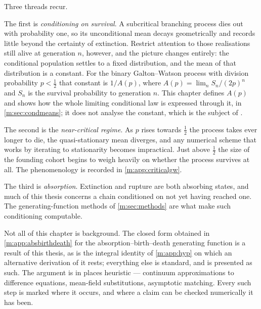 Three threads recur.

The first is \emph{conditioning on survival}. A subcritical branching process dies
out with probability one, so its unconditional mean decays geometrically and
records little beyond the certainty of extinction. Restrict attention to those
realisations still alive at generation $n$, however, and the picture changes
entirely: the conditional population settles to a fixed distribution, and the mean
of that distribution is a constant. For the binary Galton--Watson process with
division probability $p<\tfrac12$ that constant is $1/A(p)$, where
$A(p) = \lim_n S_n/(2p)^n$ and $S_n$ is the survival probability to generation $n$.
This chapter defines $A(p)$ and shows how the whole limiting conditional law is
expressed through it, in \cref{m:sec:condmeans}; it does not analyse the constant,
which is the subject of \ChA.

The second is the \emph{near-critical regime}. As $p$ rises towards $\tfrac12$ the
process takes ever longer to die, the quasi-stationary mean diverges, and any
numerical scheme that works by iterating to stationarity becomes impractical. Just
above $\tfrac12$ the size of the founding cohort begins to weigh heavily on whether
the process survives at all. The phenomenology is recorded in
\cref{m:app:criticalgw}.

The third is \emph{absorption}. Extinction and rupture are both absorbing states,
and much of this thesis concerns a chain conditioned on not yet having reached one.
The generating-function methods of \cref{m:sec:methods} are what make such
conditioning computable.

Not all of this chapter is background. The closed form obtained in
\cref{m:app:absbirthdeath} for the absorption--birth--death generating function is
a result of this thesis, as is the integral identity of \cref{m:app:hyp} on which an
alternative derivation of it rests; everything else is standard, and is presented as
such. The argument is in places heuristic --- continuum approximations to difference
equations, mean-field substitutions, asymptotic matching. Every such step is marked
where it occurs, and where a claim can be checked numerically it has been.
